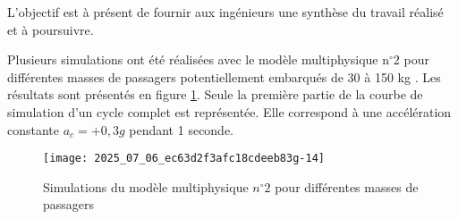 L'objectif est à présent de fournir aux ingénieurs une synthèse du travail réalisé et à poursuivre.

\ifprof
\else


Plusieurs simulations ont été réalisées avec le modèle multiphysique $\mathrm{n}^{\circ} 2$ pour différentes masses de passagers potentiellement embarqués de 30 à 150 kg . Les résultats sont présentés en figure \ref{ccs_mp_2022_fig_19}. Seule la première partie de la courbe de simulation d'un cycle complet est représentée. Elle correspond à une accélération constante $a_{c}=+0,3 g$ pendant 1 seconde.

\begin{figure}[!h]
\centering
\texttt{[image: 2025\_07\_06\_ec63d2f3afc18cdeeb83g-14]}

\caption{\label{ccs_mp_2022_fig_19}Simulations du modèle multiphysique $n^{\circ} 2$ pour différentes masses de passagers}
\end{figure}
\fi

